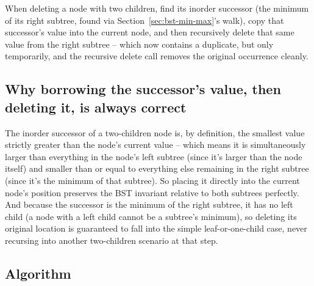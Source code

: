 \begin{ideabox}
When deleting a node with two children, find its inorder successor (the
minimum of its right subtree, found via Section~\ref{sec:bst-min-max}'s
walk), copy that successor's value into the current node, and then
recursively delete that same value from the right subtree -- which now
contains a duplicate, but only temporarily, and the recursive delete call
removes the original occurrence cleanly.
\end{ideabox}

\subsection*{Why borrowing the successor's value, then deleting it, is always correct}

The inorder successor of a two-children node is, by definition, the
smallest value strictly greater than the node's current value -- which
means it is simultaneously larger than everything in the node's left
subtree (since it's larger than the node itself) and smaller than or
equal to everything else remaining in the right subtree (since it's the
minimum of that subtree). So placing it directly into the current node's
position preserves the BST invariant relative to both subtrees perfectly.
And because the successor is the minimum of the right subtree, it has no
left child (a node with a left child cannot be a subtree's minimum), so
deleting its original location is guaranteed to fall into the simple
leaf-or-one-child case, never recursing into another two-children
scenario at that step.

\subsection*{Algorithm}

